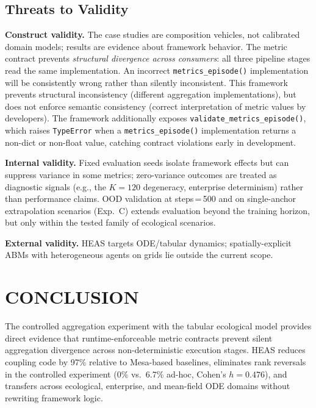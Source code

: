 \documentclass{wscpaperproc}
\begin{document}
\subsection{Threats to Validity}

\textbf{Construct validity.} The case studies are composition vehicles, not
calibrated domain models; results are evidence about framework behavior. The
metric contract prevents \emph{structural divergence across consumers}: all
three pipeline stages read the same implementation. An incorrect \texttt{metrics\_episode()}
implementation will be consistently wrong rather than silently inconsistent. This framework prevents structural inconsistency (different aggregation implementations), but does not enforce semantic consistency (correct interpretation of metric values by developers). The
framework additionally exposes \texttt{validate\_metrics\_episode()}, which raises
\texttt{TypeError} when a \texttt{metrics\_episode()} implementation returns a
non-dict or non-float value, catching contract violations early in development.

\textbf{Internal validity.} Fixed evaluation seeds isolate framework effects
but can suppress variance in some metrics; zero-variance outcomes are treated as
diagnostic signals (e.g., the $K\!=\!120$ degeneracy, enterprise determinism)
rather than performance claims. OOD validation at steps\,=\,500 and on
single-anchor extrapolation scenarios (Exp.~C) extends evaluation beyond the
training horizon, but only within the tested family of ecological scenarios.

\textbf{External validity.} HEAS targets ODE/tabular dynamics; spatially-explicit ABMs
with heterogeneous agents on grids lie outside the current scope.

\section{CONCLUSION}

The controlled aggregation experiment with the tabular ecological model provides
direct evidence that runtime-enforceable metric contracts prevent silent
aggregation divergence across non-deterministic execution stages. HEAS reduces
coupling code by 97\% relative to Mesa-based baselines, eliminates rank reversals
in the controlled experiment (0\% vs.\ 6.7\% ad-hoc, Cohen's $h = 0.476$), and
transfers across ecological, enterprise, and mean-field ODE domains without
rewriting framework logic.
\end{document}
